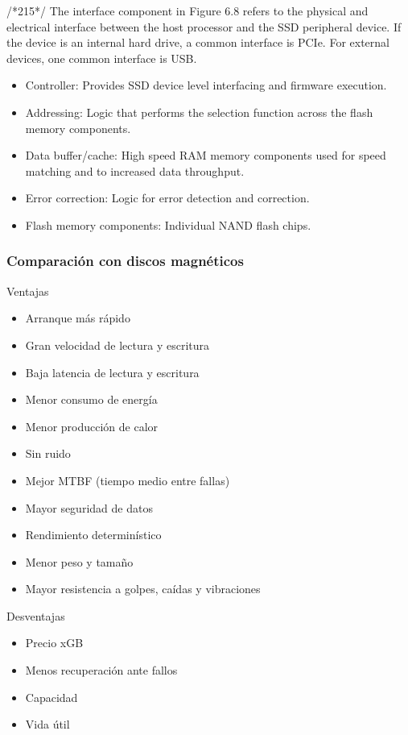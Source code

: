 /*215*/
The interface component in Figure 6.8 refers to the physical and electrical
interface between the host processor and the SSD peripheral device. If the device is
an internal hard drive, a common interface is PCIe. For external devices, one common
interface is USB.

\begin{itemize}
\item Controller: Provides SSD device level interfacing and firmware execution.
\item Addressing: Logic that performs the selection function across the flash memory components.
\item Data buffer/cache: High speed RAM memory components used for speed
matching and to increased data throughput.
\item Error correction: Logic for error detection and correction.
\item Flash memory components: Individual NAND flash chips.
\end{itemize}

\subsubsection{Comparación con discos magnéticos}
Ventajas
\begin{itemize}
\item Arranque más rápido
\item Gran velocidad de lectura y escritura
\item Baja latencia de lectura y escritura
\item Menor consumo de energía
\item Menor producción de calor
\item Sin ruido
\item Mejor MTBF (tiempo medio entre fallas)
\item Mayor seguridad de datos
\item Rendimiento determinístico
\item Menor peso y tamaño
\item Mayor resistencia a golpes, caídas y vibraciones
\end{itemize}
Desventajas
\begin{itemize}
\item Precio xGB
\item Menos recuperación ante fallos
\item Capacidad
\item Vida útil
\end{itemize}








